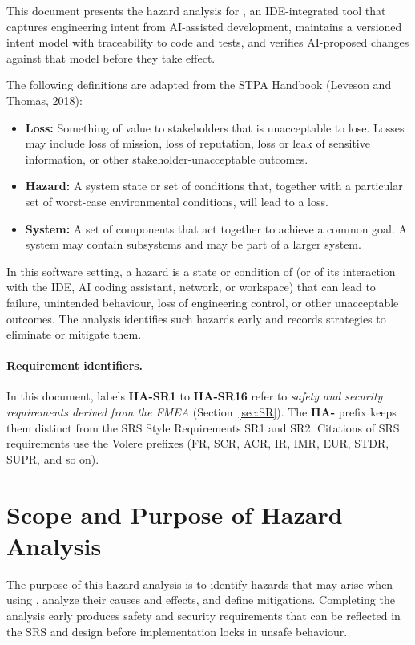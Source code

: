 \documentclass{article}
\begin{document}
This document presents the hazard analysis for \progname{}, an IDE-integrated
tool that captures engineering intent from AI-assisted development, maintains a
versioned intent model with traceability to code and tests, and verifies
AI-proposed changes against that model before they take effect.

The following definitions are adapted from the STPA Handbook
(Leveson and Thomas, 2018):

\begin{itemize}
  \item \textbf{Loss:} Something of value to stakeholders that is unacceptable
  to lose. Losses may include loss of mission, loss of reputation, loss or leak
  of sensitive information, or other stakeholder-unacceptable outcomes.
  \item \textbf{Hazard:} A system state or set of conditions that, together with
  a particular set of worst-case environmental conditions, will lead to a loss.
  \item \textbf{System:} A set of components that act together to achieve a
  common goal. A system may contain subsystems and may be part of a larger
  system.
\end{itemize}

In this software setting, a hazard is a state or condition of \progname{} (or of
its interaction with the IDE, AI coding assistant, network, or workspace) that
can lead to failure, unintended behaviour, loss of engineering control, or
other unacceptable outcomes. The analysis identifies such hazards early and
records strategies to eliminate or mitigate them.

\paragraph{Requirement identifiers.}
In this document, labels \textbf{HA-SR1} to \textbf{HA-SR16} refer to
\textit{safety and security requirements derived from the FMEA}
(Section~\ref{sec:SR}). The \textbf{HA-} prefix keeps them distinct from the
SRS Style Requirements SR1 and SR2. Citations of SRS requirements use the
Volere prefixes (FR, SCR, ACR, IR, IMR, EUR, STDR, SUPR, and so on).

\section{Scope and Purpose of Hazard Analysis}

The purpose of this hazard analysis is to identify hazards that may arise when
using \progname{}, analyze their causes and effects, and define mitigations.
Completing the analysis early produces safety and security requirements that
can be reflected in the SRS and design before implementation locks in unsafe
behaviour.
\end{document}
